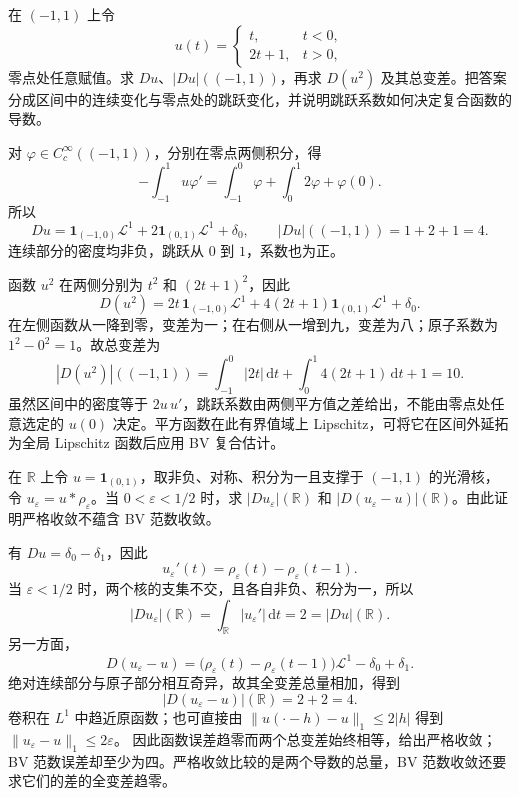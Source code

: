 \BookExercises

\begin{exercise}\label{g3:ex:bv-piecewise-affine-composition}
	在 \((-1,1)\) 上令
	\[
		u(t)=\begin{cases}t,&t<0,\\2t+1,&t>0,\end{cases}
	\]
	零点处任意赋值。求 \(Du\)、\(|Du|((-1,1))\)，再求 \(D(u^2)\) 及其总变差。把答案分成区间中的连续变化与零点处的跳跃变化，并说明跳跃系数如何决定复合函数的导数。
\end{exercise}
\begin{solution}
	对 \(\varphi\in C_c^\infty((-1,1))\)，分别在零点两侧积分，得
	\[
		-\int_{-1}^1u\varphi'
		=\int_{-1}^0\varphi+\int_0^1 2\varphi+\varphi(0).
	\]
	所以
	\[
		Du=\mathbf1_{(-1,0)}\mathcal L^1
		+2\mathbf1_{(0,1)}\mathcal L^1+\delta_0,
		\qquad |Du|((-1,1))=1+2+1=4.
	\]
	连续部分的密度均非负，跳跃从 \(0\) 到 \(1\)，系数也为正。

	函数 \(u^2\) 在两侧分别为 \(t^2\) 和 \((2t+1)^2\)，因此
	\[
		D(u^2)=2t\,\mathbf1_{(-1,0)}\mathcal L^1
		+4(2t+1)\mathbf1_{(0,1)}\mathcal L^1+\delta_0.
	\]
	在左侧函数从一降到零，变差为一；在右侧从一增到九，变差为八；原子系数为 \(1^2-0^2=1\)。故总变差为
	\[
		|D(u^2)|((-1,1))
		=\int_{-1}^0|2t|\,\mathrm dt
		+\int_0^1 4(2t+1)\,\mathrm dt+1
		=10.
	\]
	虽然区间中的密度等于 \(2u\,u'\)，跳跃系数由两侧平方值之差给出，不能由零点处任意选定的 \(u(0)\) 决定。平方函数在此有界值域上 Lipschitz，可将它在区间外延拓为全局 Lipschitz 函数后应用 BV 复合估计。
\end{solution}

\begin{exercise}\label{g3:ex:bv-strict-not-norm}
	在 \(\mathbb R\) 上令 \(u=\mathbf1_{(0,1)}\)，取非负、对称、积分为一且支撑于 \((-1,1)\) 的光滑核，令 \(u_\varepsilon=u*\rho_\varepsilon\)。当 \(0<\varepsilon<1/2\) 时，求 \(|Du_\varepsilon|(\mathbb R)\) 和 \(|D(u_\varepsilon-u)|(\mathbb R)\)。由此证明严格收敛不蕴含 BV 范数收敛。
\end{exercise}
\begin{solution}
	有 \(Du=\delta_0-\delta_1\)，因此
	\[
		u_\varepsilon'(t)=\rho_\varepsilon(t)-\rho_\varepsilon(t-1).
	\]
	当 \(\varepsilon<1/2\) 时，两个核的支集不交，且各自非负、积分为一，所以
	\[
		|Du_\varepsilon|(\mathbb R)=
		\int_{\mathbb R}|u_\varepsilon'|\,\mathrm dt=2=|Du|(\mathbb R).
	\]
	另一方面，
	\[
		D(u_\varepsilon-u)
		=\bigl(\rho_\varepsilon(t)-\rho_\varepsilon(t-1)\bigr)\mathcal L^1
		-\delta_0+\delta_1.
	\]
	绝对连续部分与原子部分相互奇异，故其全变差总量相加，得到
	\[
		|D(u_\varepsilon-u)|(\mathbb R)=2+2=4.
	\]
	卷积在 \(L^1\) 中趋近原函数；也可直接由
	\(\|u(\cdot-h)-u\|_1\le2|h|\) 得到
	\(\|u_\varepsilon-u\|_1\le2\varepsilon\)。
	因此函数误差趋零而两个总变差始终相等，给出严格收敛；BV 范数误差却至少为四。严格收敛比较的是两个导数的总量，BV 范数收敛还要求它们的差的全变差趋零。
\end{solution}

